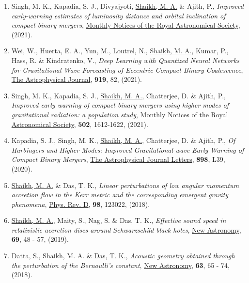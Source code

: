 \begin{enumerate}
\item Singh, M. K., Kapadia, S. J., Divyajyoti, \underline{Shaikh, M. A.} \& Ajith, P., {\itshape {Improved early-warning estimates of luminosity distance and orbital inclination of compact binary mergers}}, \href{https://doi.org/10.1093/mnras/stac852}{{Monthly Notices of the Royal Astronomical Society}}, (2021).
\item Wei, W., Huerta, E. A., Yun, M., Loutrel, N.,  \underline{Shaikh, M. A.}, Kumar, P., Hass, R. \& Kindratenko, V., {\itshape  Deep Learning with Quantized Neural Networks for Gravitational Wave Forecasting of Eccentric Compact Binary Coalescence}, \href{https://iopscience.iop.org/article/10.3847/1538-4357/ac1121}{The Astrophysical Journal}, {\bfseries 919}, 82, (2021).
\item Singh, M. K., Kapadia, S. J., \underline{Shaikh, M. A.}, Chatterjee, D. \& Ajith, P., {\itshape {Improved early warning of compact binary mergers using higher modes of gravitational radiation: a population study}}, \href{https://doi.org/10.1093/mnras/stab125}{{Monthly Notices of the Royal Astronomical Society}}, {\bfseries 502}, 1612-1622, (2021).
\item Kapadia, S. J., Singh, M. K., \underline{Shaikh, M. A.}, Chatterjee, D. \& Ajith, P., {\itshape Of Harbingers and Higher Modes: Improved Gravitational-wave Early Warning of Compact Binary Mergers}, \href{https://doi.org/10.3847%2F2041-8213%2Faba42d}{{The Astrophysical Journal Letters}}, {\bfseries 898}, L39, (2020).
\item \underline{Shaikh, M. A.} \& Das, T. K., {\itshape Linear perturbations of low angular momentum accretion flow in the Kerr metric and the corresponding emergent gravity phenomena}, \href{https://link.aps.org/doi/10.1103/PhysRevD.98.123022}{{Phys. Rev. D}}, {\bfseries 98}, 123022, (2018).
\item \underline{Shaikh, M. A.}, Maity, S., Nag, S. \& Das, T. K., {\itshape Effective sound speed in relativistic accretion discs around Schwarzschild black holes}, \href{http://www.sciencedirect.com/science/article/pii/S1384107618302896}{{New Astronomy}}, {\bfseries 69}, 48 - 57, (2019).
\item Datta, S., \underline{Shaikh, M. A.} \& Das, T. K., {\itshape Acoustic geometry obtained through the perturbation of the Bernoulli's constant}, \href{http://www.sciencedirect.com/science/article/pii/S1384107617301847}{{New Astronomy}}, {\bfseries 63}, 65 - 74, (2018).

\end{enumerate}
